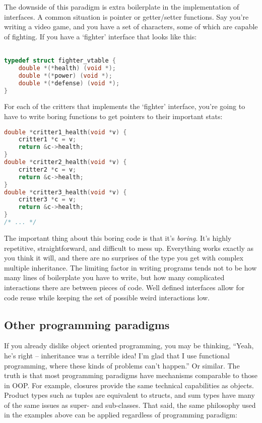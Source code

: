 \documentclass[12pt]{article}
\begin{document}
The downside of this paradigm is extra boilerplate in the implementation of interfaces.
A common situation is pointer or getter/setter functions. Say you're writing a video game,
and you have a set of characters, some of which are capable of fighting. If you have a `fighter'
interface that looks like this:

\begin{lstlisting}[language=C]

typedef struct fighter_vtable {
    double *(*health) (void *);
    double *(*power) (void *);
    double *(*defense) (void *);
}

\end{lstlisting}

For each of the critters that implements the `fighter' interface, you're going to have to
write boring functions to get pointers to their important stats:

\begin{lstlisting}[language=C]
double *critter1_health(void *v) {
    critter1 *c = v;
    return &c->health;
}
double *critter2_health(void *v) {
    critter2 *c = v;
    return &c->health;
}
double *critter3_health(void *v) {
    critter3 *c = v;
    return &c->health;
}
/* ... */
\end{lstlisting}

The important thing about this boring code is that it's \textit{boring}. It's
highly repetitive, straightforward, and difficult to mess up. Everything works
exactly as you think it will, and there are no surprises of the type you get
with complex multiple inheritance. The limiting factor in writing programs tends
not to be how many lines of boilerplate you have to write, but how many complicated
interactions there are between pieces of code. Well defined interfaces allow for
code reuse while keeping the set of possible weird interactions low.

\subsection{Other programming paradigms}

If you already dislike object oriented programming, you may be thinking,
``Yeah, he's right -- inheritance was a terrible idea! I'm glad that I use
functional programming, where these kinds of problems can't happen.'' Or
similar. The truth is that most programming paradigms have mechanisms
comparable to those in OOP. For example, closures provide the same technical
capabilities as objects. Product types such as tuples are equivalent to structs,
and sum types have many of the same issues as super- and sub-classes.
That said, the same philosophy used in the examples above can be applied regardless
of programming paradigm:
\end{document}
